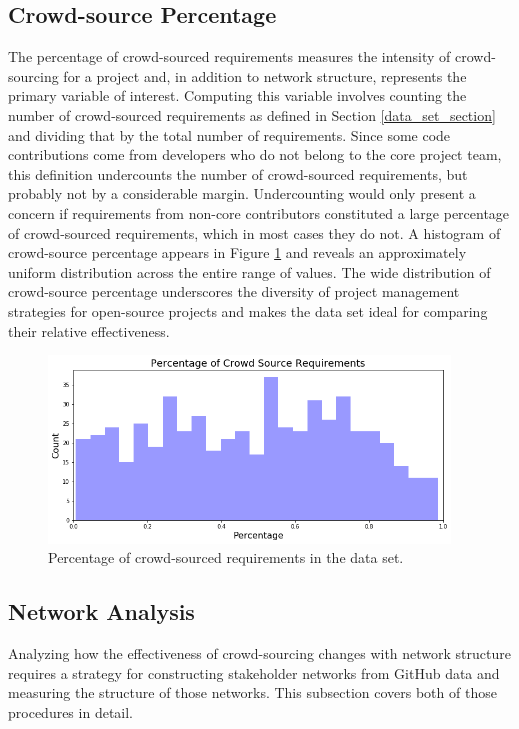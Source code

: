 \subsection{Crowd-source Percentage}

The percentage of crowd-sourced requirements measures the intensity of crowd-sourcing for a project and, in addition to network structure, represents the primary variable of interest. Computing this variable involves counting the number of crowd-sourced requirements as defined in Section \ref{data_set_section} and dividing that by the total number of requirements. Since some code contributions come from developers who do not belong to the core project team, this definition undercounts the number of crowd-sourced requirements, but probably not by a considerable margin. Undercounting would only present a concern if requirements from non-core contributors constituted a large percentage of crowd-sourced requirements, which in most cases they do not.  A histogram of crowd-source percentage appears in Figure \ref{crowd_pct_hist} and reveals an approximately uniform distribution across the entire range of values. The wide distribution of crowd-source percentage underscores the diversity of project management strategies for open-source projects and makes the data set ideal for comparing their relative effectiveness.

\begin{figure}
  \includegraphics[width=0.95\textwidth]{crowd_pct_hist.png}
\caption{Percentage of crowd-sourced requirements in the data set.}
\label{crowd_pct_hist}
\end{figure}

\subsection{Network Analysis}

Analyzing how the effectiveness of crowd-sourcing changes with network structure requires a strategy for constructing stakeholder networks from GitHub data and measuring the structure of those networks. This subsection covers both of those procedures in detail.

